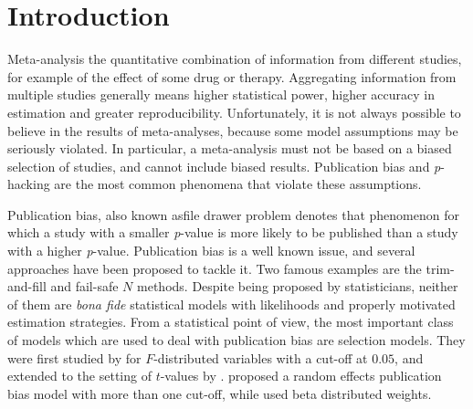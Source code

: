 \documentclass{article}
\theoremstyle{plain}
\theoremstyle{definition}
\begin{document}



\section{Introduction}

Meta-analysis the quantitative combination of information from different studies, for example of the effect of some drug or therapy. Aggregating information from multiple studies generally means higher statistical power, higher accuracy in estimation and greater reproducibility. Unfortunately, it is not always possible to believe in the results of meta-analyses, because some model assumptions may be seriously violated. In particular, a meta-analysis must not be based on a biased selection of studies, and cannot include biased results. Publication bias \citep{sterling1959publication} and \textit{p}-hacking \citep{simmons2011false} are the most common phenomena that violate these assumptions. 

Publication bias, also known asfile drawer problem \citep[see, e.g.,][]{iyengar1988selection} denotes that phenomenon for which a study with a smaller \textit{p}-value is more likely to be published than a study with a higher \textit{p}-value. Publication bias is a well known issue, and several approaches have been proposed to tackle it. Two famous examples are the trim-and-fill \citep{duval2000trim} and fail-safe $N$ \citep{becker2005failsafe} methods. Despite being proposed by statisticians, neither of them are \emph{bona fide} statistical models with likelihoods and properly motivated estimation strategies. From a statistical point of view, the most important class of models which are used to deal with publication bias are selection models. They were first studied by \citet{hedges1984estimation} for $F$-distributed variables with a cut-off at $0.05$, and extended to the setting of $t$-values by \citet{iyengar1988selection}. \citet{hedges1992modeling} proposed a random effects publication bias model with more than one cut-off, while \citet{citkowicz2017parsimonious} used beta distributed weights.
\end{document}
